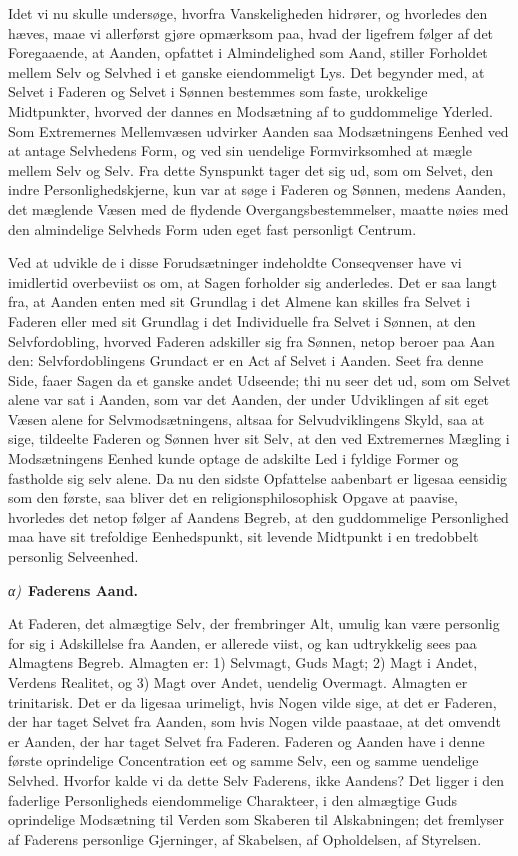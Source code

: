 \documentclass[12pt]{book}
\newcommand{\greekrun}[2]{%
  \medskip\begin{center}{\itshape #1)}\ {\bfseries #2}\end{center}\medskip}
\begin{document}
Idet vi nu skulle undersøge, hvorfra Vanskeligheden hidrører, og
hvorledes den hæves, maae vi allerførst gjøre opmærksom paa, hvad
der ligefrem følger af det Foregaaende, at Aanden, opfattet i
Almindelighed som Aand, stiller Forholdet mellem Selv og Selvhed i
et ganske eiendommeligt Lys. Det begynder med, at Selvet i Faderen
og Selvet i Sønnen bestemmes som faste, urokkelige Midtpunkter,
hvorved der dannes en Modsætning af to guddommelige Yderled. Som
Extremernes Mellemvæsen udvirker Aanden saa Modsætningens Eenhed ved
at antage Selvhedens Form, og ved sin uendelige Formvirksomhed at
mægle mellem Selv og Selv. Fra dette Synspunkt tager det sig ud, som
om Selvet, den indre Personlighedskjerne, kun var at søge i Faderen
og Sønnen, medens Aanden, det mæglende Væsen med de flydende
Overgangsbestemmelser, maatte nøies med den almindelige Selvheds
Form uden eget fast personligt Centrum.

Ved at udvikle de i disse Forudsætninger indeholdte Conseqvenser
have vi imidlertid overbeviist os om, at Sagen forholder sig
anderledes. Det er saa langt fra, at Aanden enten med sit Grundlag i
det Almene kan skilles fra Selvet i Faderen eller med sit Grundlag i
det Individuelle fra Selvet i Sønnen, at den Selvfordobling, hvorved
Faderen adskiller sig fra Sønnen, netop beroer paa Aan\-
den: Selvfordoblingens Grundact er en Act af Selvet i Aanden. Seet
fra denne Side, faaer Sagen da et ganske andet Udseende; thi nu seer
det ud, som om Selvet alene var sat i Aanden, som var det Aanden,
der under Udviklingen af sit eget Væsen alene for
Selvmodsætningens, altsaa for Selvudviklingens Skyld, saa at sige,
tildeelte Faderen og Sønnen hver sit Selv, at den ved Extremernes
Mægling i Modsætningens Eenhed kunde optage de adskilte Led i
fyldige Former og fastholde sig selv alene. Da nu den sidste
Opfattelse aabenbart er ligesaa eensidig som den første, saa bliver
det en religionsphilosophisk Opgave at paavise, hvorledes det netop
følger af Aandens Begreb, at den guddommelige Personlighed maa have
sit trefoldige Eenhedspunkt, sit levende Midtpunkt i en tredobbelt
personlig Selveenhed.

\greekrun{α}{Faderens Aand.}

At Faderen, det almægtige Selv, der frembringer Alt, umulig kan være
personlig for sig i Adskillelse fra Aanden, er allerede viist, og
kan udtrykkelig sees paa Almagtens Begreb. Almagten er: 1)
Selvmagt, Guds Magt; 2) Magt i Andet, Verdens Realitet, og 3) Magt
over Andet, uendelig Overmagt. Almagten er trinitarisk. Det er da
ligesaa urimeligt, hvis Nogen vilde sige, at det er Faderen, der har
taget Selvet fra Aanden, som hvis Nogen vilde paastaae, at det
omvendt er Aanden, der har taget Selvet fra Faderen. Faderen og
Aanden have i denne første oprindelige Concentration eet og samme
Selv, een og samme uendelige Selvhed. Hvorfor kalde vi da dette Selv
Faderens, ikke Aandens? Det ligger i den faderlige Personligheds
eiendommelige Charakteer, i den almægtige Guds oprindelige
Modsætning til Verden som Skaberen til Alskabningen; det fremlyser
af Faderens personlige Gjerninger, af Skabelsen, af Opholdelsen, af
Styrelsen.
\end{document}
